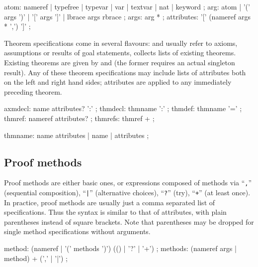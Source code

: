 \begin{rail}
  atom: nameref | typefree | typevar | var | textvar | nat | keyword
  ;
  arg: atom | '(' args ')' | '[' args ']' | lbrace args rbrace
  ;
  args: arg *
  ;
  attributes: '[' (nameref args * ',') ']'
  ;
\end{rail}

Theorem specifications come in several flavours:  and
 usually refer to axioms, assumptions or results of goal
statements,  collects lists of existing theorems.
Existing theorems are given by  and 
(the former requires an actual singleton result).  Any of these theorem
specifications may include lists of attributes both on the left and right hand
sides; attributes are applied to any immediately preceding theorem.

\begin{rail}
  axmdecl: name attributes? ':'
  ;
  thmdecl: thmname ':'
  ;
  thmdef: thmname '='
  ;
  thmref: nameref attributes?
  ;
  thmrefs: thmref +
  ;

  thmname: name attributes | name | attributes
  ;
\end{rail}


\subsection{Proof methods}\label{sec:syn-meth}

Proof methods are either basic ones, or expressions composed of methods via
``\texttt{,}'' (sequential composition), ``\texttt{|}'' (alternative choices),
``\texttt{?}'' (try), ``\texttt{+}'' (at least once).  In practice, proof
methods are usually just a comma separated list of
~ specifications.  Thus the syntax is
similar to that of attributes, with plain parentheses instead of square
brackets.  Note that parentheses may be dropped for single method
specifications without arguments.

\begin{rail}
  method: (nameref | '(' methods ')') (() | '?' | '+')
  ;
  methods: (nameref args | method) + (',' | '|')
  ;
\end{rail}


